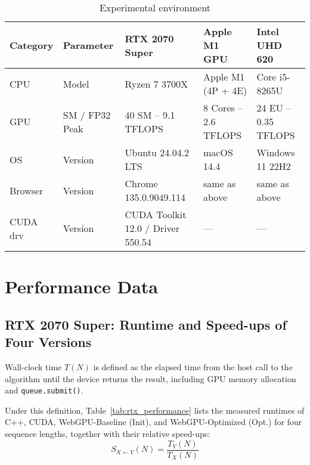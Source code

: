 \documentclass[PhD]{PHlab-thesis}
\begin{document}
\begin{table}[htbp]
  \centering
  \caption{Experimental environment}
  \label{tab:exp_env}
  \setlength{\tabcolsep}{8pt}
  \renewcommand{\arraystretch}{1.4}
  \begin{tabularx}{\textwidth}{@{}lX X X X@{}}
    \toprule
    Category & Parameter & RTX 2070 Super & Apple M1 GPU & Intel UHD 620 \\
    \midrule
    CPU      & Model                 & Ryzen 7 3700X        & Apple M1 (4P + 4E) & Core i5-8265U \\
    GPU      & SM / FP32 Peak        & 40 SM – 9.1 TFLOPS   & 8 Cores – 2.6 TFLOPS & 24 EU – 0.35 TFLOPS \\
    OS       & Version               & Ubuntu 24.04.2 LTS   & macOS 14.4           & Windows 11 22H2 \\
    Browser  & Version               & Chrome 135.0.9049.114 & same as above        & same as above \\
    CUDA drv & Version               & CUDA Toolkit 12.0 / Driver 550.54 & — & — \\
    \bottomrule
  \end{tabularx}
\end{table}

\section{Performance Data}
\subsection{RTX 2070 Super: Runtime and Speed-ups of Four Versions}
Wall-clock time $T(N)$ is defined as the elapsed time from the host call to the algorithm until the device returns the result, including GPU memory allocation and \texttt{queue.submit()}.

Under this definition, Table~\ref{tab:rtx_performance} lists the measured runtimes of C++, CUDA, WebGPU-Baseline (Init), and WebGPU-Optimized (Opt.) for four sequence lengths, together with their relative speed-ups:
\[
S_{X \leftarrow Y}(N) = \frac{T_Y(N)}{T_X(N)}
\]
\end{document}
